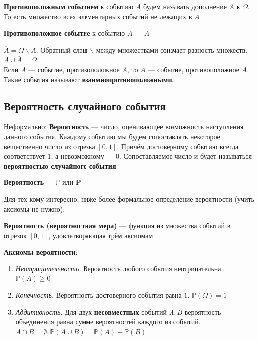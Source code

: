 \begin{definition}
\textbf{Противоположным событием} к событию $A$ будем называть дополнение $A$ к $\Omega$. То есть множество всех элементарных событий не лежащих в $A$
\end{definition}

\begin{designation}
\textbf{Противоположное событие} к событию $A$  —  $\overline{A}$
\end{designation}

$\overline{A} = \Omega \backslash A$. Обратный слэш $\backslash$ между множествами означает разность множеств.\\
 $A\cup\overline{A} = \Omega$\\
 Если $\overline{A}$  —  событие, противоположное $A$, то $A$  —  событие, противоположное $\overline{A}$. Такие события называют \textbf{взаимнопротивоположными}.


\subsection{Вероятность случайного события}

Неформально: \textbf{Вероятность}  —  число, оценивающее возможность наступления данного события. Каждому событию мы будем сопоставлять некоторое вещественно число из отрезка $[0,1]$. Причём достоверному событию всегда соответствует $1$, а невозможному  —  $0$. Сопоставляемое число и будет называться \textbf{вероятностью случайного события}\\

\begin{designation}
\textbf{Вероятность}  —  $\mathbb{P}$ или $\mathbf{P}$
\end{designation}

Для тех кому интересно, ниже более формальное определение вероятности (учить аксиомы не нужно):\\

\begin{definition}
\textbf{Вероятность (вероятностная мера)}  —  функция из множества событий в отрезок $[0,1]$, удовлетворяющая трём аксиомам
\end{definition}

\begin{axioms}\label{theorem-1}
\textbf{Аксиомы вероятности}:\\

\begin{enumerate}
\item \emph{Неотрицательность.} Вероятность любого события неотрицательна $\mathbb{P}(A) \geq 0$
\item \emph{Конечность.} Вероятность достоверного события равна $1$. $\mathbb{P}(\Omega) = 1$
\item \emph{Аддитивность.} Для двух \textbf{несовместных} событий $A, B$ вероятность объединения равна сумме вероятностей каждого из событий. $A\cap B = \emptyset, \mathbb{P}(A\cup B) = \mathbb{P}(A) + \mathbb{P}(B)$
\end{enumerate}
\end{axioms}

